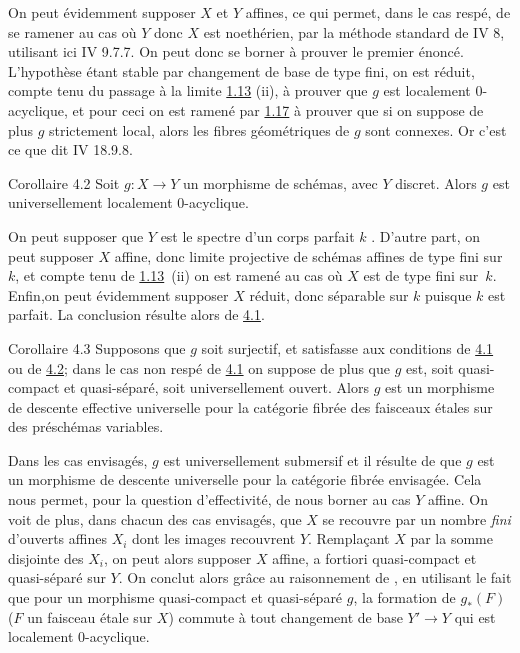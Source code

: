 \documentclass[10pt]{../fichiers-configuration-latex/smfart}
\begin{document}
On peut évidemment supposer $X$ et $Y$ affines, ce qui permet, dans le
cas respé, de se ramener au cas où $Y$ donc $X$ est noethérien, par la
méthode standard de \EGA IV 8, utilisant ici \EGA IV 9.7.7. On peut donc
se borner à prouver le premier énoncé. L'hypothèse étant stable par
changement de base de type fini, on est réduit, compte tenu du passage
à la limite \hyperref[XV.prop1.13]{1.13} (ii), à prouver que $g$ est localement $0$-acyclique,
et pour ceci on est ramené par \hyperref[XV.cor1.17]{1.17} à prouver que si on suppose de
plus $g$ strictement local, alors les fibres géométriques de $g$ sont
connexes. Or c'est ce que dit \EGA IV 18.9.8.

\begin{enonce*}{Corollaire 4.2}
Soit $g:X\rightarrow Y$ un morphisme de schémas, avec $Y$
discret. Alors $g$ est universellement localement $0$-acyclique.
\end{enonce*}

On peut supposer que $Y$ est le spectre d'un corps parfait $k$
.
D'autre part, on peut supposer $X$ affine, donc limite projective
de schémas affines de type fini sur $k$, et compte tenu de \hyperref[XV.prop1.13]{1.13}~(ii)
on est ramené au cas où $X$ est de type fini sur~$k$.
Enfin,\pageoriginale on peut évidemment supposer $X$ réduit, donc
séparable sur $k$ puisque $k$ est parfait. La conclusion résulte alors
de \hyperref[XV.thm4.1]{4.1}.

\begin{enonce*}{Corollaire 4.3}
Supposons que $g$ soit surjectif, et satisfasse aux conditions de
\hyperref[XV.thm4.1]{4.1} ou de \hyperref[XV.cor4.2]{4.2}; dans le cas non respé de \hyperref[XV.thm4.1]{4.1} on suppose de plus
que $g$ est, soit quasi-compact et quasi-séparé, soit universellement
ouvert. Alors $g$ est un morphisme de descente effective universelle
pour la catégorie fibrée des faisceaux étales sur des préschémas
variables.
\end{enonce*}

Dans les cas envisagés, $g$ est universellement submersif et il
résulte de  que $g$ est un morphisme de descente universelle
pour la catégorie fibrée envisagée. Cela nous permet, pour la question
d'effectivité, de nous borner au cas $Y$ affine. On voit de plus, dans
chacun des cas envisagés, que $X$ se recouvre par un nombre
\emph{fini} d'ouverts affines $X_i$ dont les images recouvrent
$Y$. Remplaçant $X$ par la somme disjointe des $X_i$, on peut alors
supposer $X$ affine, a fortiori quasi-compact et quasi-séparé sur
$Y$. On conclut alors grâce au raisonnement de , en
utilisant le fait  que pour un morphisme quasi-compact et
quasi-séparé $g$, la formation de $g_{\ast}(F)$ ($F$ un faisceau étale
sur $X$) commute à tout changement de base $Y'\rightarrow Y$ qui est
localement $0$-acyclique.
\end{document}
